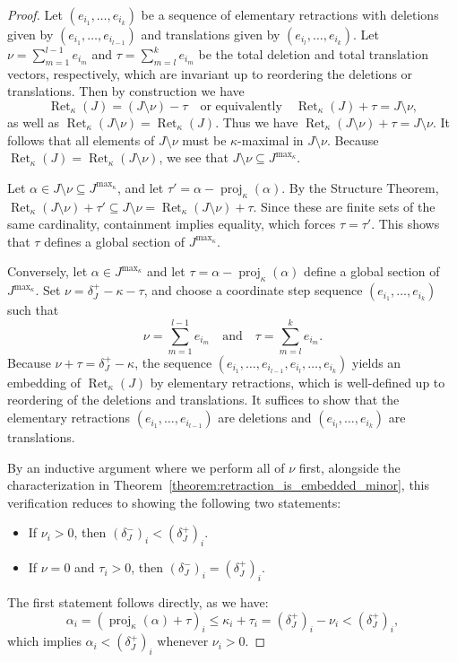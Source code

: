 \documentclass[11pt]{article}
\theoremstyle{definition}
\theoremstyle{remark}
\newcommand{\delplus}{\delta_J^+}
\newcommand{\delminus}{\delta_J^-}
\DeclareMathOperator{\proj}{proj}              %
\newcommand{\kproj}{\proj_{\kappa}}            %
\DeclareMathOperator{\Ret}{Ret}                %
\newcommand{\RetK}{\Ret_{\kappa}}              %
\newcommand{\Jmax}{J^{\max_{\kappa}}}
\begin{document}
\begin{proof}
    Let $(e_{i_1}, \dots, e_{i_k})$ be a sequence of elementary retractions with deletions given by $(e_{i_1}, \dots, e_{i_{l-1}})$ and translations given by $(e_{i_l}, \dots, e_{i_k})$. Let $\nu = \sum_{m=1}^{l-1}e_{i_m}$ and $\tau = \sum_{m=l}^k e_{i_m}$ be the total deletion and total translation vectors, respectively, which are invariant up to reordering the deletions or translations. Then by construction we have 
    \[
    \RetK(J) = (J\setminus \nu)-\tau \quad \text{or equivalently} \quad \RetK(J) + \tau = J\setminus \nu,
    \]
    as well as $\RetK(J \setminus \nu) = \RetK(J)$. Thus we have $\RetK(J \setminus \nu) + \tau = J \setminus \nu$. It follows that all elements of $J \setminus \nu$ must be $\kappa$-maximal in $J \setminus \nu$. Because $\RetK(J) = \RetK(J \setminus \nu)$, we see that $J \setminus \nu \subseteq \Jmax$.
    
    Let $\alpha \in J \setminus \nu \subseteq \Jmax$, and let $\tau' = \alpha - \kproj(\alpha)$. By the Structure Theorem, $\RetK(J \setminus \nu) + \tau' \subseteq J \setminus \nu = \RetK(J\setminus \nu) + \tau$. Since these are finite sets of the same cardinality, containment implies equality, which forces $\tau = \tau'$. This shows that $\tau$ defines a global section of $\Jmax$. 

    \smallskip
    Conversely, let $\alpha \in \Jmax$ and let $\tau = \alpha - \kproj(\alpha)$ define a global section of $\Jmax$. Set $\nu = \delplus - \kappa - \tau$, and choose a coordinate step sequence $(e_{i_1}, \dots, e_{i_k})$ such that 
    \[
    \nu = \sum_{m = 1}^{l-1}e_{i_m} \quad \text{and}\quad \tau = \sum_{m = l}^k e_{i_m}.
    \]
    Because $\nu + \tau = \delplus - \kappa$, the sequence $(e_{i_1}, \dots, e_{i_{l-1}}, e_{i_l}, \dots, e_{i_k})$ yields an embedding of $\RetK(J)$ by elementary retractions, which is well-defined up to reordering of the deletions and translations. It suffices to show that the elementary retractions $(e_{i_1}, \dots, e_{i_{l-1}})$ are deletions and $(e_{i_l}, \dots, e_{i_k})$ are translations.

    By an inductive argument where we perform all of $\nu$ first, alongside the characterization in Theorem~\ref{theorem:retraction_is_embedded_minor}, this verification reduces to showing the following two statements:
    \begin{itemize}
        \item If $\nu_i > 0$, then $(\delminus)_i < (\delplus)_i$.
        \item If $\nu = 0$ and $\tau_i > 0$, then $(\delminus)_i = (\delplus)_i$.
    \end{itemize}
    The first statement follows directly, as we have: 
    \[
    \alpha_i = (\kproj(\alpha) + \tau)_i \leq \kappa_i + \tau_i = (\delplus)_i - \nu_i < (\delplus)_i,
    \]
    which implies $\alpha_i < (\delplus)_i$ whenever $\nu_i > 0$.


\end{proof}
\end{document}
